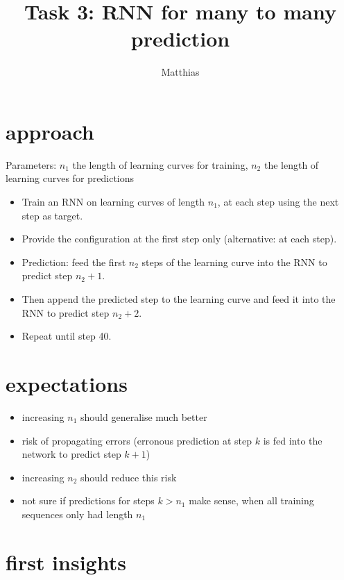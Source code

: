 \documentclass[a4paper,10pt]{article}
\title{Task 3: RNN for many to many prediction}
\author{Matthias}
\begin{document}
\maketitle

\section{approach}

Parameters: $n_1$ the length of learning curves for training, $n_2$ the length of learning curves for predictions

\begin{itemize}
 \item Train an RNN on learning curves of length $n_1$, at each step using the next step as target.
 \item Provide the configuration at the first step only (alternative: at each step).
 \item Prediction: feed the first $n_2$ steps of the learning curve into the RNN to predict step $n_2 + 1$.
 \item Then append the predicted step to the learning curve and feed it into the RNN to predict step $n_2 + 2$.
 \item Repeat until step 40.
\end{itemize}


\section{expectations}

\begin{itemize}
 \item increasing $n_1$ should generalise much better
 \item risk of propagating errors (erronous prediction at step $k$ is fed into the network to predict step $k+1$)
 \item increasing $n_2$ should reduce this risk
 \item not sure if predictions for steps $k > n_1$ make sense, when all training sequences only had length $n_1$
\end{itemize}


\section{first insights}
\end{document}
